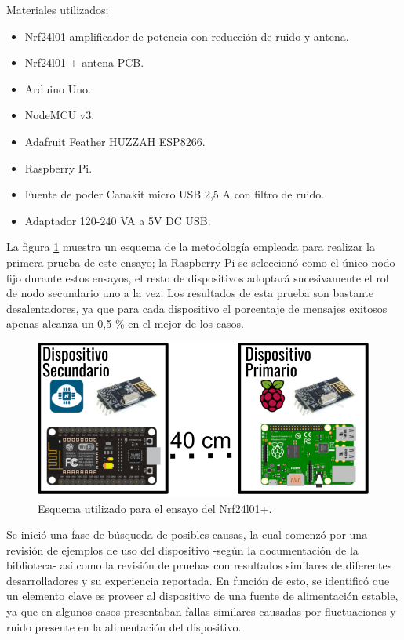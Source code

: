 Materiales utilizados:
\begin{itemize}
\item  Nrf24l01 amplificador de potencia con reducción de ruido y antena.
\item  Nrf24l01 + antena PCB.
\item  Arduino Uno.   
\item  NodeMCU v3.
\item  Adafruit Feather HUZZAH ESP8266.
\item  Raspberry Pi.
\item  Fuente de poder Canakit micro USB 2,5 A con filtro de ruido.
\item Adaptador 120-240 VA a 5V DC USB.
\end{itemize}

La figura \ref{fig:figura_a} muestra un esquema de la metodología empleada para realizar la primera prueba de este ensayo; la Raspberry Pi se seleccionó como el único nodo fijo durante estos ensayos, el resto de dispositivos adoptará sucesivamente el rol de nodo secundario uno a la vez. Los resultados de esta prueba son bastante desalentadores, ya que para cada dispositivo el porcentaje de mensajes exitosos apenas alcanza un 0,5 \% en el mejor de los casos.

\vspace{5mm} %

\begin{figure}[ht]
	\centering
	\includegraphics[scale=.45]{./Figures/Capitulo4/Figura_A.png}
	\caption{Esquema utilizado para el ensayo del Nrf24l01+.}
	\label{fig:figura_a}
\end{figure}


Se inició una fase de búsqueda de posibles causas, la cual comenzó por una revisión de ejemplos de uso del dispositivo -según la documentación de la biblioteca- así como la revisión de pruebas con resultados similares de diferentes desarrolladores y su experiencia reportada. En función de esto, se identificó que un elemento clave es proveer al dispositivo de una fuente de alimentación estable, ya que en algunos casos presentaban fallas similares causadas por fluctuaciones y ruido presente en la alimentación del dispositivo.

